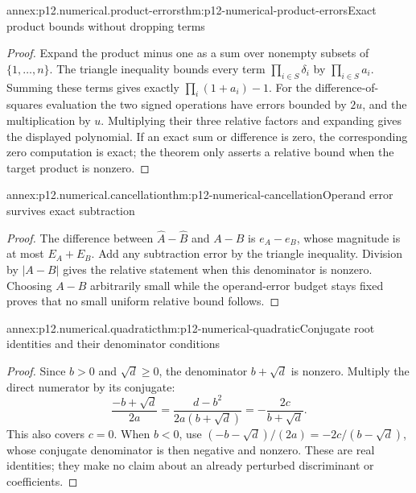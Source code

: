 \begin{annexitem}{annex:p12.numerical.product-errors}{thm:p12-numerical-product-errors}{Exact product bounds without dropping terms}
\begin{proof}
Expand the product minus one as a sum over nonempty subsets of
\(\{1,\ldots,n\}\). The triangle inequality bounds every term
\(\prod_{i\in S}\delta_i\) by \(\prod_{i\in S}a_i\).
Summing these terms gives exactly \(\prod_i(1+a_i)-1\).
For the difference-of-squares evaluation the two signed operations have
errors bounded by \(2u\), and the multiplication by \(u\).
Multiplying their three relative factors and expanding gives the
displayed polynomial. If an exact sum or difference is zero, the
corresponding zero computation is exact; the theorem only asserts a
relative bound when the target product is nonzero.
\end{proof}
\end{annexitem}

\begin{annexitem}{annex:p12.numerical.cancellation}{thm:p12-numerical-cancellation}{Operand error survives exact subtraction}
\begin{proof}
The difference between \(\widehat A-\widehat B\) and \(A-B\) is
\(e_A-e_B\), whose magnitude is at most \(E_A+E_B\).
Add any subtraction error by the triangle inequality. Division by
\(|A-B|\) gives the relative statement when this denominator is nonzero.
Choosing \(A-B\) arbitrarily small while the operand-error budget
stays fixed proves that no small uniform relative bound follows.
\end{proof}
\end{annexitem}

\begin{annexitem}{annex:p12.numerical.quadratic}{thm:p12-numerical-quadratic}{Conjugate root identities and their denominator conditions}
\begin{proof}
Since \(b>0\) and \(\sqrt d\geq0\), the denominator
\(b+\sqrt d\) is nonzero. Multiply the direct numerator by its
conjugate:
\[
 \frac{-b+\sqrt d}{2a}
 =\frac{d-b^2}{2a(b+\sqrt d)}
 =-\frac{2c}{b+\sqrt d}.
\]
This also covers \(c=0\). When \(b<0\), use
\((-b-\sqrt d)/(2a)=-2c/(b-\sqrt d)\), whose conjugate
denominator is then negative and nonzero. These are real identities;
they make no claim about an already perturbed discriminant or coefficients.
\end{proof}
\end{annexitem}

